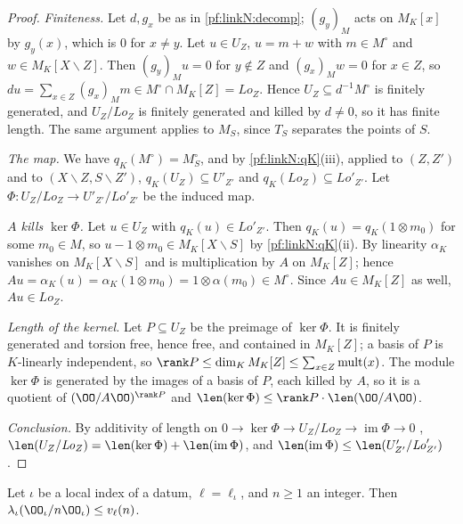\begin{proof}
\emph{Finiteness.} Let $d,g_x$ be as in \cref{pf:linkN:decomp}; $(g_y)_M$ acts on $M_K[x]$ by $g_y(x)$, which is $0$ for
$x\ne y$. Let $u\in U_Z$, $u=m+w$ with $m\in M^\circ$ and $w\in M_K[X\smallsetminus Z]$. Then $(g_y)_Mu=0$ for $y\notin Z$ and
$(g_x)_Mw=0$ for $x\in Z$, so $du=\sum_{x\in Z}(g_x)_Mm\in M^\circ\cap M_K[Z]=\mathit{Lo}_Z$. Hence $U_Z\subseteq d^{-1}M^\circ$ is
finitely generated, and $U_Z/\mathit{Lo}_Z$ is finitely generated and killed by $d\ne0$, so it has finite length. The same
argument applies to $M_S$, since $T_S$ separates the points of $S$.

\emph{The map.} We have $q_K(M^\circ)=M_S^\circ$, and by \cref{pf:linkN:qK}(iii), applied to $(Z,Z')$ and to
$(X\smallsetminus Z,S\smallsetminus Z')$, $q_K(U_Z)\subseteq U'_{Z'}$ and $q_K(\mathit{Lo}_Z)\subseteq\mathit{Lo}'_{Z'}$. Let
$\Phi:U_Z/\mathit{Lo}_Z\to U'_{Z'}/\mathit{Lo}'_{Z'}$ be the induced map.

\emph{$A$ kills $\ker\Phi$.} Let $u\in U_Z$ with $q_K(u)\in\mathit{Lo}'_{Z'}$. Then $q_K(u)=q_K(1\otimes m_0)$ for some $m_0\in M$,
so $u-1\otimes m_0\in M_K[X\smallsetminus S]$ by \cref{pf:linkN:qK}(ii). By linearity $\alpha_K$ vanishes on
$M_K[X\smallsetminus S]$ and is multiplication by $A$ on $M_K[Z]$; hence $Au=\alpha_K(u)=\alpha_K(1\otimes m_0)=1\otimes\alpha(m_0)\in
M^\circ$. Since $Au\in M_K[Z]$ as well, $Au\in\mathit{Lo}_Z$.

\emph{Length of the kernel.} Let $P\subseteq U_Z$ be the preimage of $\ker\Phi$. It is finitely generated and torsion free,
hence free, and contained in $M_K[Z]$; a basis of $P$ is $K$-linearly independent, so
$\rank P\le\dim_KM_K[Z]\le\sum_{x\in Z}\linkNmult(x)$. The module $\ker\Phi$ is generated by the images of a basis of $P$,
each killed by $A$, so it is a quotient of $(\OO/A\OO)^{\rank P}$ and $\len(\ker\Phi)\le\rank P\cdot\len(\OO/A\OO)$.

\emph{Conclusion.} By additivity of length on $0\to\ker\Phi\to U_Z/\mathit{Lo}_Z\to\operatorname{im}\Phi\to0$
\cite[Prop.~6.9]{AtiyahMacdonald1969}, $\len(U_Z/\mathit{Lo}_Z)=\len(\ker\Phi)+\len(\operatorname{im}\Phi)$, and
$\len(\operatorname{im}\Phi)\le\len(U'_{Z'}/\mathit{Lo}'_{Z'})$.
\end{proof}

\begin{lemma}\label{pf:linkN:lenunit}
Let $\iota$ be a local index of a datum, $\ell=\ell_\iota$, and $n\ge1$ an integer. Then
$\lambda_\iota(\OO_\iota/n\OO_\iota)\le v_\ell(n)$.
\end{lemma}

